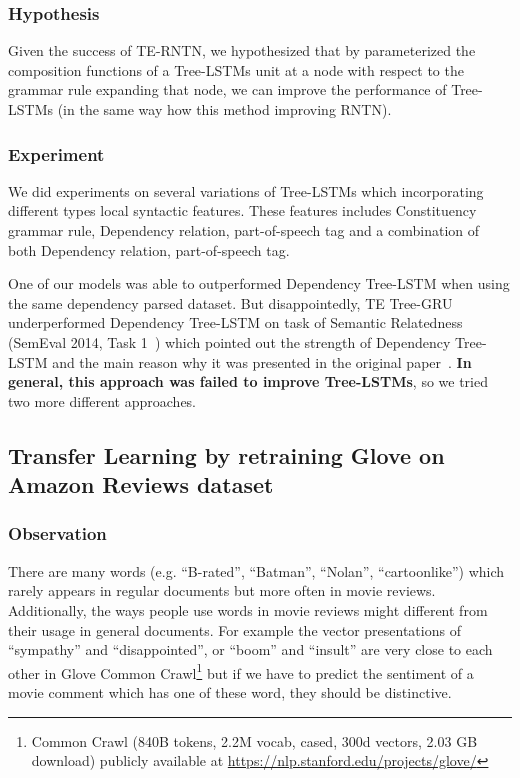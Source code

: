 \subsubsection{Hypothesis}
Given the success of TE-RNTN, we hypothesized that by parameterized the composition functions of a Tree-LSTMs unit at a node with respect to the grammar rule expanding that node, we can improve the performance of Tree-LSTMs (in the same way how this method improving RNTN).

\subsubsection{Experiment}
We did experiments on several variations of Tree-LSTMs which incorporating different types local syntactic features.
These features includes Constituency grammar rule, Dependency relation, part-of-speech tag and a combination of both Dependency relation, part-of-speech tag.

One of our models was able to outperformed Dependency Tree-LSTM when using the same dependency parsed dataset.
But disappointedly, TE Tree-GRU underperformed Dependency Tree-LSTM on task of Semantic Relatedness (SemEval 2014, Task 1~\cite{SemeEvalTask1}) which pointed out the strength of Dependency Tree-LSTM and the main reason why it was presented in the original paper~\cite{treeLSTM}.
\textbf{In general, this approach was failed to improve Tree-LSTMs}, so we tried two more different approaches.

\subsection{Transfer Learning by retraining Glove on Amazon Reviews dataset}
\label{sec:second-method}
\subsubsection{Observation}
There are many words (e.g. ``B-rated'', ``Batman'', ``Nolan'', ``cartoonlike'') which rarely appears in regular documents but more often in movie reviews.
Additionally, the ways people use words in movie reviews might different from their usage in general documents.
For example the vector presentations of ``sympathy'' and ``disappointed'', or ``boom'' and ``insult'' are very close to each other in Glove Common Crawl\footnote{Common Crawl (840B tokens, 2.2M vocab, cased, 300d vectors, 2.03 GB download) publicly available at \url{https://nlp.stanford.edu/projects/glove/}} but if we have to predict the sentiment of a movie comment which has one of these word, they should be distinctive.

